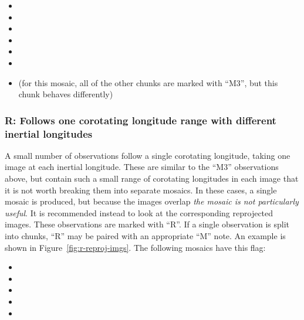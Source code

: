 \begin{itemize}
\item {}
\item {}
\item {}
\item {}
\item {}
\item {}
\item {} (for this mosaic, all of the other chunks are marked with “M3”, but this chunk behaves differently)
\end{itemize}

\subsubsection{R: Follows one corotating longitude range with different inertial longitudes}
\label{sec:r-follows-one-corotating-longitude-range-with-di}

A small number of observations follow a single corotating longitude, taking one image at each inertial longitude. These are similar to the “M3” observations above, but contain such a small range of corotating longitudes in each image that it is not worth breaking them into separate mosaics. In these cases, a single mosaic is produced, but because the images overlap \textit{the mosaic is not particularly useful}. It is recommended instead to look at the corresponding reprojected images. These observations are marked with “R”. If a single observation is split into chunks, “R” may be paired with an appropriate “M” note. An example is shown in Figure~\ref{fig:r-reproj-imgs}. The following mosaics have this flag:

\begin{itemize}
\item {}
\item {}
\item {}
\item {}
\item {}
\end{itemize}


